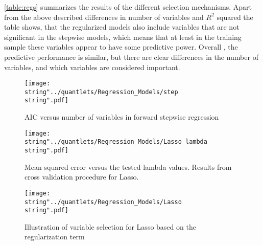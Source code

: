 \autoref{table:regs} summarizes the results of the different selection mechanisms. Apart from the above described differences in number of variables and  $R^{2}$ squared the table shows, that the regularized models also include variables that are not significant in the stepwise models, which means that at least in the training sample these variables appear to have some predictive power. Overall , the predictive performance is similar, but there are clear differences in the number of variables, and which variables are considered important. 
\begin{figure}[H]
  \centering
\texttt{[image: \\string"../quantlets/Regression\_Models/step\\string".pdf]}
  \caption{AIC versus number of variables in forward stepwise regression}\label{fig:step}
\end{figure}
 
\begin{figure}[H]
  \centering
\texttt{[image: \\string"../quantlets/Regression\_Models/Lasso\_lambda\\string".pdf]}
  \caption{Mean squared error versus the tested lambda values. Results from cross validation procedure for Lasso.}\label{fig:Lasso}
\end{figure}

\begin{figure}[H]
  \centering
\texttt{[image: \\string"../quantlets/Regression\_Models/Lasso\\string".pdf]}
  \caption{Illustration of variable selection for Lasso based on the regularization term}\label{fig:Lasso1}
\end{figure}

 
\FloatBarrier